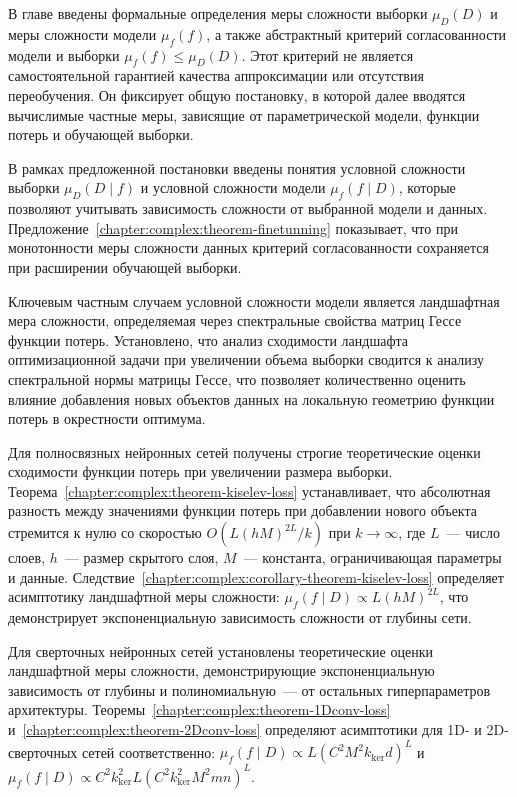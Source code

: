 В главе введены формальные определения меры сложности выборки $\mu_D(D)$ и меры сложности модели $\mu_f(f)$, а также абстрактный критерий согласованности модели и выборки $\mu_f(f) \leq \mu_D(D)$.
Этот критерий не является самостоятельной гарантией качества аппроксимации или отсутствия переобучения. Он фиксирует общую постановку, в которой далее вводятся вычислимые частные меры, зависящие от параметрической модели, функции потерь и обучающей выборки.

В рамках предложенной постановки введены понятия условной сложности выборки $\mu_D(D\mid f)$ и условной сложности модели $\mu_f(f\mid D)$, которые позволяют учитывать зависимость сложности от выбранной модели и данных.
Предложение~\ref{chapter:complex:theorem-finetunning} показывает, что при монотонности меры сложности данных критерий согласованности сохраняется при расширении обучающей выборки.

Ключевым частным случаем условной сложности модели является ландшафтная мера сложности, определяемая через спектральные свойства матриц Гессе функции потерь. Установлено, что анализ сходимости ландшафта оптимизационной задачи при увеличении объема выборки сводится к анализу спектральной нормы матрицы Гессе, что позволяет количественно оценить влияние добавления новых объектов данных на локальную геометрию функции потерь в окрестности оптимума.

Для полносвязных нейронных сетей получены строгие теоретические оценки сходимости функции потерь при увеличении размера выборки. Теорема~\ref{chapter:complex:theorem-kiselev-loss} устанавливает, что абсолютная разность между значениями функции потерь при добавлении нового объекта стремится к нулю со скоростью $O(L(hM)^{2L}/k)$ при $k \to \infty$, где $L$~--- число слоев, $h$~--- размер скрытого слоя, $M$~--- константа, ограничивающая параметры и данные. Следствие~\ref{chapter:complex:corollary-theorem-kiselev-loss} определяет асимптотику ландшафтной меры сложности: $\mu_f(f\mid D) \propto L(hM)^{2L}$, что демонстрирует экспоненциальную зависимость сложности от глубины сети.

Для сверточных нейронных сетей установлены теоретические оценки ландшафтной меры сложности, демонстрирующие экспоненциальную зависимость от глубины и полиномиальную~--- от остальных гиперпараметров архитектуры. Теоремы~\ref{chapter:complex:theorem-1Dconv-loss} и~\ref{chapter:complex:theorem-2Dconv-loss} определяют асимптотики для 1D- и 2D-сверточных сетей соответственно: $\mu_f(f\mid D) \propto L(C^2M^2k_{\mathrm{ker}}d)^{L}$ и $\mu_f(f\mid D) \propto C^2k_{\mathrm{ker}}^2L(C^2k_{\mathrm{ker}}^2M^2mn)^{L}$.

